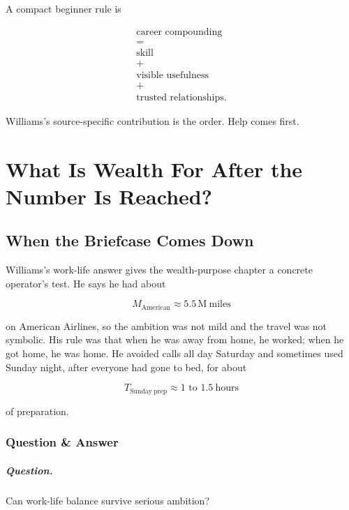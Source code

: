 \documentclass[11pt,oneside]{book}
\begin{document}
A compact beginner rule is

\begin{equation}
\begin{gathered}
\text{career compounding}\\
=\\
\text{skill}\\
+\\
\text{visible usefulness}\\
+\\
\text{trusted relationships}.
\end{gathered}
\end{equation}

Williams's source-specific contribution is the order. Help comes first.

\chapter{What Is Wealth For After the Number Is Reached?}

\section{When the Briefcase Comes Down}

Williams's work-life answer gives the wealth-purpose chapter a concrete operator's test. He says he had about

\begin{equation}
M_{\mathrm{American}}\approx 5.5\,\mathrm{M\ miles}
\end{equation}

on American Airlines, so the ambition was not mild and the travel was not symbolic. His rule was that when he was away from home, he worked; when he got home, he was home. He avoided calls all day Saturday and sometimes used Sunday night, after everyone had gone to bed, for about

\begin{equation}
T_{\mathrm{Sunday\ prep}}\approx 1\text{ to }1.5\ \mathrm{hours}
\end{equation}

of preparation.

\subsection{Question \& Answer}

\paragraph{Question.}
Can work-life balance survive serious ambition?
\end{document}
